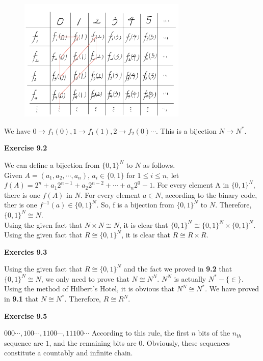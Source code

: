 \documentclass{article} %
\begin{document}
    \begin{figure}[H]
  	\centering
  	\includegraphics[width=8cm]{9_1_3.png}
  	\caption{}
  	\label{}
  	\end{figure}
    We have $0\rightarrow f_1\left(0\right),1\rightarrow f_1\left(1\right),2\rightarrow f_2\left(0\right)\cdots$. This is a bijection $N\rightarrow N^*$.


\textbf{Exercise 9.2}\par
We can define a bijection from $\{0,1\}^N$ to $N$ as follows.\\
Given $A=(a_1,a_2,\cdots,a_n)$, $a_i \in \{0,1\}$ for $1\leq i \leq n$, let $f(A)=2^{n}+a_1 2^{n-1}+a_2 2^{n-2}+\cdots +a_n2^0-1$. For every element A in $\{0,1\}^N$, there is one $f(A)$ in $N$. For every element $a\in N$, according to the binary code, ther is one $f^{-1}(a) \in \{0,1\}^N$. So, f is a bijection from $\{0,1\}^N$ to $N$. Therefore, $\{0,1\}^N\cong N$.\\
Using the given fact that $N\times N\cong N$, it is clear that $\{0,1\}^N\cong \{0,1\}^N\times \{0,1\}^N$.\\
Using the given fact that $R\cong \{0,1\}^N$, it is clear that $R\cong R\times R$.

\textbf{Exercies 9.3}\par
Using the given fact that $R\cong \{0,1\}^N$ and the fact we proved in \textbf{9.2} that $\{0,1\}^N\cong N$, we only need to prove that $N\cong N^N$. $N^N$ is actually $N^*-\{\in\}$. Using the method of Hilbert's Hotel, it is obvious that $N^N\cong N^*$. We have proved in \textbf{9.1} that $N\cong N^*$. Therefore, $R\cong R^N$.
 




	\textbf{Exercise 9.5}\par
    $000\cdots,100\cdots,1100\cdots,11100\cdots$ According to this rule, the first $n$ bits of the $n_{th}$ sequence are $1$, and the remaining bits are $0$. Obviously, these sequences constitute a countably and infinite chain.
	
\end{document}
